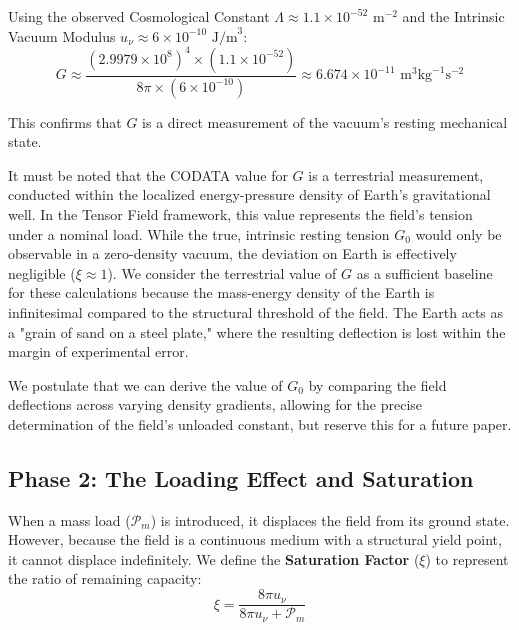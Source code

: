 \documentclass{article}
\begin{document}
Using the observed Cosmological Constant $\Lambda \approx 1.1 \times 10^{-52} \text{ m}^{-2}$ and the Intrinsic Vacuum Modulus $u_\nu \approx 6 \times 10^{-10} \text{ J/m}^3$:
\begin{equation}
G \approx \frac{(2.9979 \times 10^8)^4 \times (1.1 \times 10^{-52})}{8\pi \times (6 \times 10^{-10})} \approx 6.674 \times 10^{-11} \text{ m}^3\text{kg}^{-1}\text{s}^{-2}
\end{equation}

This confirms that $G$ is a direct measurement of the vacuum's resting mechanical state. 

It must be noted that the CODATA value for $G$ is a terrestrial measurement, conducted within the localized energy-pressure density of Earth's gravitational well. In the Tensor Field framework, this value represents the field's tension under a nominal load. While the true, intrinsic resting tension $G_0$ would only be observable in a zero-density vacuum, the deviation on Earth is effectively negligible ($\xi \approx 1$). We consider the terrestrial value of $G$ as a sufficient baseline for these calculations because the mass-energy density of the Earth is infinitesimal compared to the structural threshold of the field. The Earth acts as a "grain of sand on a steel plate," where the resulting deflection is lost within the margin of experimental error. 

We postulate that we can derive the value of $G_0$ by comparing the field deflections across varying density gradients, allowing for the precise determination of the field's unloaded constant, but reserve this for a future paper.

\subsection{Phase 2: The Loading Effect and Saturation}
When a mass load ($\mathcal{P}_m$) is introduced, it displaces the field from its ground state. However, because the field is a continuous medium with a structural yield point, it cannot displace indefinitely. We define the \textbf{Saturation Factor} ($\xi$) to represent the ratio of remaining capacity:
\begin{equation}
\xi = \frac{8\pi u_\nu}{8\pi u_\nu + \mathcal{P}_m}
\end{equation}
\end{document}
